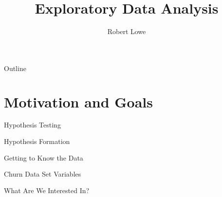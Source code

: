 \documentclass[handout]{beamer}
\title{Exploratory Data Analysis}
\author{Robert Lowe\\}
\institute[Maryville College] %
{
  Division of Mathematics and Computer Science\\
  Maryville College
}
\date[]{}
\begin{document}
\begin{frame}
  \titlepage
\end{frame}

\begin{frame}{Outline}
  \tableofcontents
\end{frame}





\section{Motivation and Goals}
\begin{frame}{Hypothesis Testing}
\end{frame}

\begin{frame}{Hypothesis Formation}
\end{frame}

\begin{frame}{Getting to Know the Data}
\end{frame}

\begin{frame}{Churn Data Set Variables}
\end{frame}

\begin{frame}{What Are We Interested In?}
\end{frame}
\end{document}
